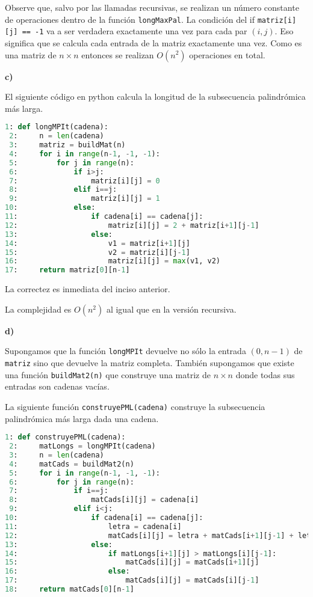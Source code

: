 \documentclass{article}
\begin{document}
Observe que, salvo por las llamadas recursivas, se realizan un número constante de operaciones dentro de la función \texttt{longMaxPal}. La condición del if \texttt{matriz[i][j] == -1} va a ser verdadera exactamente una vez para cada par $(i, j)$. Eso significa que se calcula cada entrada de la matriz exactamente una vez. Como es una matriz de $n \times n$ entonces se realizan $O(n^2)$ operaciones en total.

\textbf{c)}

El siguiente código en python calcula la longitud de la subsecuencia palindrómica más larga.

\begin{lstlisting}[language=Python]
 1: def longMPIt(cadena):
 2:     n = len(cadena)
 3:     matriz = buildMat(n)
 4:     for i in range(n-1, -1, -1):
 5:         for j in range(n):
 6:             if i>j:
 7:                 matriz[i][j] = 0
 8:             elif i==j:
 9:                 matriz[i][j] = 1
10:             else:
11:                 if cadena[i] == cadena[j]:
12:                     matriz[i][j] = 2 + matriz[i+1][j-1]
13:                 else:
14:                     v1 = matriz[i+1][j]
15:                     v2 = matriz[i][j-1]
16:                     matriz[i][j] = max(v1, v2)
17:     return matriz[0][n-1]
\end{lstlisting}

La correctez es inmediata del inciso anterior.

La complejidad es $O(n^2)$ al igual que en la versión recursiva.

\textbf{d)}

Supongamos que la función \texttt{longMPIt} devuelve no sólo la entrada $(0, n-1)$ de \texttt{matriz} sino que devuelve la matriz completa. También supongamos que existe una función \texttt{buildMat2(n)} que construye una matriz de $n \times n$ donde todas sus entradas son cadenas vacías.

La siguiente función \texttt{construyePML(cadena)} construye la subsecuencia palindrómica más larga dada una cadena.

\begin{lstlisting}[language=Python]
 1: def construyePML(cadena):
 2:     matLongs = longMPIt(cadena)
 3:     n = len(cadena)
 4:     matCads = buildMat2(n)
 5:     for i in range(n-1, -1, -1):
 6:         for j in range(n):
 7:             if i==j:
 8:                 matCads[i][j] = cadena[i]
 9:             elif i<j:
10:                 if cadena[i] == cadena[j]:
11:                     letra = cadena[i]
12:                     matCads[i][j] = letra + matCads[i+1][j-1] + letra
13:                 else:
14:                     if matLongs[i+1][j] > matLongs[i][j-1]:
15:                         matCads[i][j] = matCads[i+1][j]
16:                     else:
17:                         matCads[i][j] = matCads[i][j-1]
18:     return matCads[0][n-1]
\end{lstlisting}
\end{document}
